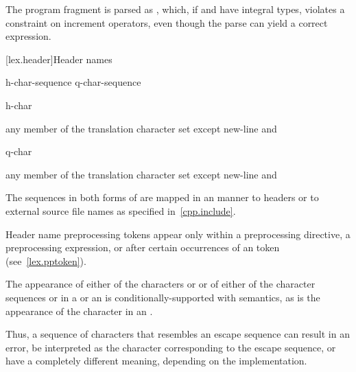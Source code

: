\pnum
\begin{example}
The program fragment  is parsed as , which, if  and  have integral types,
violates a constraint on increment operators, even though the parse
 can yield a correct expression.
\end{example}

[lex.header]{Header names}

%
\begin{bnf}
\obeyspaces
{}\br
    \terminal{<} h-char-sequence \terminal{>}\br
     q-char-sequence 
\end{bnf}

\begin{bnf}
\br
    h-char 
\end{bnf}

\begin{bnf}
\br
    \textnormal{any member of the translation character set except new-line and }
\end{bnf}

\begin{bnf}
\br
    q-char 
\end{bnf}

\begin{bnf}
\br
    \textnormal{any member of the translation character set except new-line and }
\end{bnf}

\pnum
The sequences in both forms of  are mapped in an
 manner to headers or to
external source file names as specified in~\ref{cpp.include}.
\begin{note}
Header name preprocessing tokens appear only within
a  preprocessing directive,
a  preprocessing expression, or
after certain occurrences of an  token
(see~\ref{lex.pptoken}).
\end{note}

\pnum
The appearance of either of the characters  or \tcode{\textbackslash} or of
either of the character sequences \tcode{/*} or \tcode{//} in a
 or an 
is conditionally-supported with  semantics, as is the appearance of the character
 in an .
\begin{note}
Thus, a sequence of characters
that resembles an escape sequence can result in an error, be interpreted as the
character corresponding to the escape sequence, or have a completely different meaning,
depending on the implementation.
\end{note}

